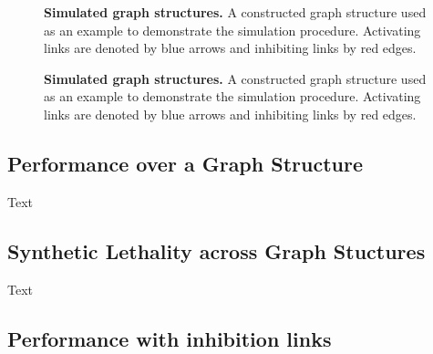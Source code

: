 \begin{figure*}[!htb]
\begin{mdframed}
\begin{center}
   \end{center}
   \caption[Simulated graph structures]{\small \textbf{\textbf{Simulated graph structures.}} A constructed graph structure used as an example to demonstrate the simulation procedure. Activating links are denoted by blue arrows and inhibiting links by red edges.}
\label{fig:simple_graph_pi3k1}
\end{mdframed}
\end{figure*}

\begin{figure*}[!htb]
\begin{mdframed}
\begin{center}
   \end{center}
   \caption[Simulated graph structures]{\small \textbf{\textbf{Simulated graph structures.}} A constructed graph structure used as an example to demonstrate the simulation procedure. Activating links are denoted by blue arrows and inhibiting links by red edges.}
\label{fig:simple_graph_Gai1}
\end{mdframed}
\end{figure*}

\subsection{Performance over a Graph Structure}


Text

\subsection{Synthetic Lethality across Graph Stuctures}


Text

\subsection{Performance with inhibition links}


